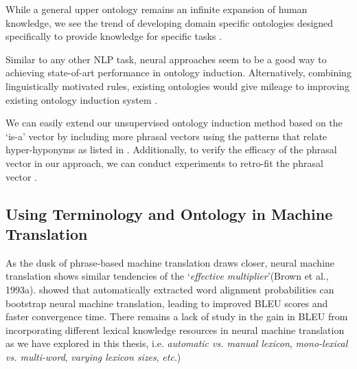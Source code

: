 While a general upper ontology remains an infinite expansion of human knowledge, we see the trend of developing domain specific ontologies designed specifically to provide knowledge for specific tasks \citep{task17semeval2015,task13semeval2016,jurgens-pilehvar:2016:SemEval}. 

Similar to any other NLP task, neural approaches seem to be a good way to achieving state-of-art performance \citep{shwartz-goldberg-dagan:2016:P16-1,2016arXiv160805014S} in ontology induction. Alternatively, combining linguistically motivated rules, existing ontologies would give mileage to improving existing ontology induction system \citep{lefeverhybrid}. 

We can easily extend our unsupervised ontology induction method based on the `is-a' vector by including more phrasal vectors using the patterns that relate hyper-hyponyms as listed in \citep{hearst1992}. Additionally, to verify the efficacy of the phrasal vector in our approach, we can conduct experiments to retro-fit the phrasal vector \citep{faruqui2014retrofitting}.

\subsection{Using Terminology and Ontology in Machine Translation}

As the dusk of phrase-based machine translation draws closer, neural machine translation \citep{luong2015effective,sennrich2015neural,wu2016google,crego2016systran,kalchbrenner2016neural} shows similar tendencies of the `\textit{effective multiplier}'(Brown et al., 1993a). \cite{arthur-neubig-nakamura:2016:EMNLP2016} showed that automatically extracted word alignment probabilities can bootstrap neural machine translation, leading to improved BLEU scores and faster convergence time. There remains a lack of study in the gain in BLEU from incorporating different lexical knowledge resources in neural machine translation as we have explored in this thesis, i.e. \textit{automatic vs. manual lexicon}, \textit{mono-lexical vs. multi-word}, \textit{varying lexicon sizes}, \textit{etc}.)


